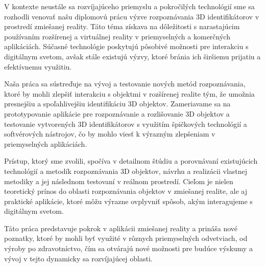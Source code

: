 V kontexte neustále sa rozvíjajúceho priemyslu a pokročilých technológií sme sa rozhodli venovať našu diplomovú prácu výzve rozpoznávania 3D identifikátorov v prostredí zmiešanej reality. Táto téma získava na dôležitosti s narastajúcim používaním rozšírenej a virtuálnej reality v priemyselných a komerčných aplikáciách. Súčasné technológie poskytujú pôsobivé možnosti pre interakciu s digitálnym svetom, avšak stále existujú výzvy, ktoré bránia ich širšiemu prijatiu a efektívnemu využitiu.

Naša práca sa sústreďuje na vývoj a testovanie nových metód rozpoznávania, ktoré by mohli zlepšiť interakciu s objektmi v rozšírenej realite tým, že umožnia presnejšiu a spoľahlivejšiu identifikáciu 3D objektov. Zameriavame sa na prototypovanie aplikácie pre rozpoznávanie a rozlišovanie 3D objektov a testovanie vytvorených 3D identifikátorov s využitím špičkových technológií a softvérových nástrojov, čo by mohlo viesť k výrazným zlepšeniam v priemyselných aplikáciách.

Prístup, ktorý sme zvolili, spočíva v detailnom štúdiu a porovnávaní existujúcich technológií a metodík rozpoznávania 3D objektov, návrhu a realizácii vlastnej metodiky a jej následnom testovaní v reálnom prostredí. Cieľom je nielen teoretický prínos do oblasti rozpoznávania objektov v zmiešanej realite, ale aj praktické aplikácie, ktoré môžu výrazne ovplyvniť spôsob, akým interagujeme s digitálnym svetom.

Táto práca predstavuje pokrok v aplikácii zmiešanej reality a prináša nové poznatky, ktoré by mohli byť využité v rôznych priemyselných odvetviach, od výroby po zdravotníctvo, čím sa otvárajú nové možnosti pre budúce výskumy a vývoj v tejto dynamicky sa rozvíjajúcej oblasti.